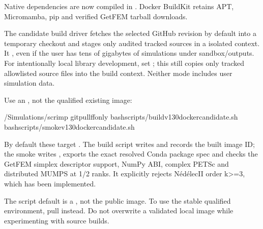 \documentclass[letterpaper,10pt,english]{sphinxmanual}
\begin{document}
\sphinxAtStartPar
Native dependencies are now compiled in . Docker BuildKit retains
APT, Micromamba, pip and verified GetFEM tarball downloads.

\sphinxAtStartPar
The candidate build driver fetches the selected GitHub revision
by default into a temporary checkout and stages only audited tracked
sources in a  isolated context. It , even if the user has tens of gigabytes
of simulations under sandbox/outputs. For intentionally local
library development, set ; this still
copies only tracked allowlisted source files into the build context.
Neither mode includes user simulation data.

\sphinxAtStartPar
Use an , not the qualified existing
 image:

\begin{sphinxVerbatim}[commandchars=\\\{\}]
\PYGZti{}/Simulations/scrimp
gitpull\PYGZhy{}\PYGZhy{}ff\PYGZhy{}only
bashscripts/build\PYGZhy{}v130\PYGZhy{}docker\PYGZhy{}candidate.sh
bashscripts/smoke\PYGZhy{}v130\PYGZhy{}docker\PYGZhy{}candidate.sh
\end{sphinxVerbatim}

\sphinxAtStartPar
By default these target . The build script
writes  and records the
built image ID; the smoke writes
, exports the exact
resolved Conda package spec and checks the GetFEM simplex descriptor
support, NumPy ABI, complex PETSc and distributed MUMPS at 1/2 ranks.
It explicitly rejects Nédélec\sphinxhyphen{}II order k\textgreater{}=3, which has 
been implemented.

\sphinxAtStartPar
The  script default is a ,
not the public image. To use the stable qualified environment,
pull  instead. Do not overwrite a
validated local image while experimenting with source builds.
\end{document}
